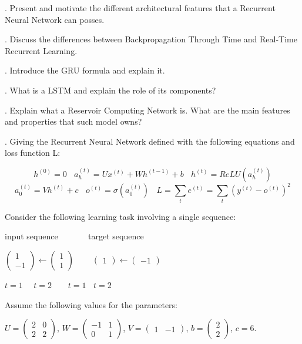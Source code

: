 . Present and motivate the different architectural features that a Recurrent Neural Network can posses.

. Discuss the differences between Backpropagation Through Time and Real-Time Recurrent Learning.

. Introduce the GRU formula and explain it.

. What is a LSTM and explain the role of its components?

. Explain what a Reservoir Computing Network is. What are the main features and properties that such model owns?


. Giving the Recurrent Neural Network defined with the following equations and loss function L:

$$ h^{(0)} = 0  ~~~~ a_{h}^{(t)} = Ux^{(t)} + Wh^{(t-1)} + b  ~~~~ h^{(t)} = ReLU(a_{h}^{(t)}) $$
$$ a_{0}^{(t)} = V h^{(t)} + c ~~~~ o^{(t)} = \sigma \left( a_{0}^{(t)} \right) ~~~~ L = \sum_{t} e^{(t)} = \sum_{t} \left( y^{(t)} - o^{(t)} \right)^{2} $$

\noindent Consider the following learning task involving a single sequence:

input sequence   ~~~~~~ target sequence

$ \begin{pmatrix} 1 \\ -1 \end{pmatrix} \leftarrow  \begin{pmatrix} 1 \\ 1 \end{pmatrix}  ~~~~~~~~~~  \begin{pmatrix} 1 \end{pmatrix} \leftarrow  \begin{pmatrix} -1 \end{pmatrix}  $ 

$ t = 1  ~~~~~~ t = 2  ~~~~~~~~~ t=1 ~~~~ t=2$

\noindent Assume the following values for the parameters:

$ U = \begin{pmatrix} 2 & 0 \\ 2 & 2  \end{pmatrix} $, $ W = \begin{pmatrix} -1 & 1 \\ 0 & 1  \end{pmatrix} $, $ V = \begin{pmatrix} 1 & -1 \end{pmatrix} $, $ b = \begin{pmatrix} 2 \\ 2 \end{pmatrix} $, $c=6$. 

